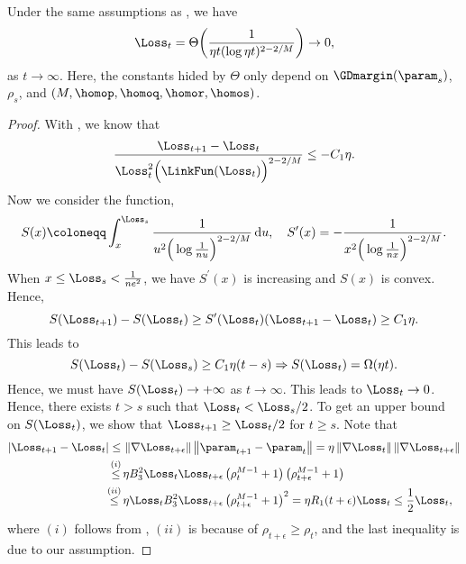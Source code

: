 \begin{lemma}
\label{lem: Loss convergence GD}
Under the same assumptions as , we have
\begin{equation}
\label{eq: loss convergence GD}
        \Loss_t =  \Theta \bigg( \frac{1}{\eta t (\log  \eta t)^{2-2/M}} \bigg) \to 0, 
\end{equation}
as $t \to \infty$. Here, the constants hided by $\Theta$ only depend on $\GDmargin(\param_s)$, $\rho_s$, and $(M, \homop, \homoq, \homor, \homos)$.
\end{lemma}
\begin{proof}
With , we know that
\[
\frac{ \Loss_{t+1} - \Loss_t}{\Loss_t^2 \Big(\LinkFun(\Loss_t)\Big)^{2-2 / M}} \le - C_1 \eta. 
\] 
Now we consider the function, 
\[
S(x) \coloneqq \int_x^{\Loss_s} \frac{1}{u^2 \Big(\log \frac{1}{n u}\Big)^{2-2 / M}} \, \mathrm{d} u, \quad S^\prime (x) = -\frac{1}{x^2 \Big(\log \frac{1}{n x}\Big)^{2-2 / M}}.
\] 
When $x\le \Loss_s < \frac{1}{ne^2}$, we have $S^\prime (x)$ is increasing and $S(x)$ is convex. Hence, 
\[
S(\Loss_{t+1}) - S(\Loss_t)\ge S^\prime (\Loss_t) (\Loss_{t+1} - \Loss_t) \ge C_1 \eta.  
\] 
This leads to 
\[
S(\Loss_t) - S(\Loss_s) \ge C_1 \eta(t-s) \Rightarrow S(\Loss_t) = \Omega( \eta t).
\] 
Hence, we must have $S(\Loss_t) \to +\infty$ as $t \to \infty$. This leads to $\Loss_t \to 0$. Hence, there exists $t > s$ such that $\Loss_t < \Loss_s / 2$. To get an upper bound on $S(\Loss_t)$, we show that $\Loss_{t+1} \ge \Loss_t / 2$ for $t \ge s$. Note that
\begin{align*}
    \left\vert \Loss_{t+1} - \Loss_t \right\vert \le \, & \left\| \nabla \Loss_{t+\epsilon} \right\| \left\| \param_{t+1} - \param_t \right\| = \eta \left\| \nabla \Loss_t \right\| \left\| \nabla \Loss_{t+\epsilon} \right\| \\
    \stackrel{(i)}{\le} \, & \eta B_3^2 \Loss_t \Loss_{t+\epsilon} \left( \rho_t^{M - 1} + 1 \right) \left( \rho_{t+\epsilon}^{M - 1} + 1 \right) \\
    \stackrel{(ii)}{\le} \, & \eta \Loss_t B_3^2 \Loss_{t+\epsilon} \left( \rho_{t+\epsilon}^{M - 1} + 1 \right)^2 = \eta R_1 (t+\epsilon) \Loss_t \le \frac{1}{2} \Loss_t,
\end{align*}
where $(i)$ follows from , $(ii)$ is because of $\rho_{t+\epsilon} \ge \rho_t$, and the last inequality is due to our assumption.

\end{proof}
